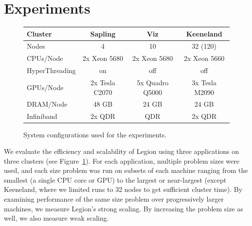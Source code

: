 \section{Experiments}
\label{sec:exp}



\begin{figure}
{\footnotesize
\begin{tabular}{l|ccc}
Cluster & Sapling & Viz & Keeneland \\
\midrule
Nodes   &   4     &  10 &  32 (120) \\
CPUs/Node & 2x Xeon 5680 & 2x Xeon 5680 & 2x Xeon 5660 \\
HyperThreading & on & off & off \\
GPUs/Node & 2x Tesla C2070 & 5x Quadro Q5000 & 3x Tesla M2090 \\
DRAM/Node & 48 GB & 24 GB & 24 GB \\
Infiniband & 2x QDR & QDR & 2x QDR \\
\end{tabular}
}
\vspace{-2mm}
\caption{System configurations used for the experiments. \label{fig:systems}}
\vspace{-6mm}
\end{figure}

%
%
%  


We evaluate the efficiency and scalability of Legion using
three applications on three clusters (see Figure~\ref{fig:systems}).
For each application, multiple problem sizes were used, and each size problem was
run on subsets of each machine ranging from the smallest (a single CPU core or GPU)
to the largest or near-largest (except Keeneland, where we limited
runs to 32 nodes to get sufficient cluster time).
By examining performance of the same size problem over progressively larger
machines, we measure Legion's strong scaling.
By increasing the problem size as well, we also measure weak scaling.

